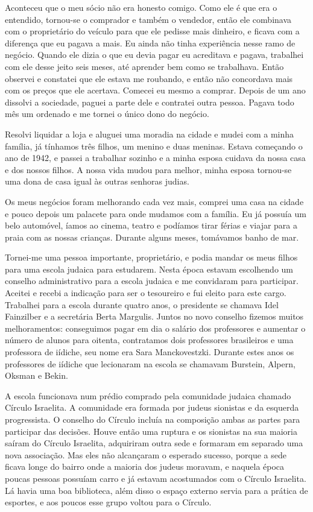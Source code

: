 Aconteceu que o meu sócio não era honesto comigo. Como ele é que era o
entendido, tornou-se o comprador e também o vendedor, então ele
combinava com o proprietário do veículo para que ele pedisse mais
dinheiro, e ficava com a diferença que eu pagava a mais. Eu ainda não
tinha experiência nesse ramo de negócio. Quando ele dizia o que eu devia
pagar eu acreditava e pagava, trabalhei com ele desse jeito seis meses,
até aprender bem como se trabalhava. Então observei e constatei que ele
estava me roubando, e então não concordava mais com os preços que ele
acertava. Comecei eu mesmo a comprar. Depois de um ano dissolvi a
sociedade, paguei a parte dele e contratei outra pessoa. Pagava todo mês
um ordenado e me tornei o único dono do negócio.

Resolvi liquidar a loja e aluguei uma moradia na cidade e mudei com a
minha família, já tínhamos três filhos, um menino e duas meninas. Estava
começando o ano de 1942, e passei a trabalhar sozinho e a minha esposa
cuidava da nossa casa e dos nossos filhos. A nossa vida mudou para
melhor, minha esposa tornou-se uma dona de casa igual às outras senhoras
judias.

Os meus negócios foram melhorando cada vez mais, comprei uma casa na
cidade e pouco depois um palacete para onde mudamos com a família. Eu já
possuía um belo automóvel, íamos ao cinema, teatro e podíamos tirar
férias e viajar para a praia com as nossas crianças. Durante alguns
meses, tomávamos banho de mar.

Tornei-me uma pessoa importante, proprietário, e podia mandar os meus
filhos para uma escola judaica para estudarem. Nesta época estavam
escolhendo um conselho administrativo para a escola judaica e me
convidaram para participar. Aceitei e recebi a indicação para ser o
tesoureiro e fui eleito para este cargo. Trabalhei para a escola durante
quatro anos, o presidente se chamava Idel Fainzilber e a secretária
Berta Margulis. Juntos no novo conselho fizemos muitos melhoramentos:
conseguimos pagar em dia o salário dos professores e aumentar o número
de alunos para oitenta, contratamos dois professores brasileiros e uma
professora de iídiche, seu nome era Sara Manckovestzki. Durante estes
anos os professores de iídiche que lecionaram na escola se chamavam
Burstein, Alpern, Oksman e Bekin.

A escola funcionava num prédio comprado pela comunidade judaica chamado
Círculo Israelita. A comunidade era formada por judeus sionistas e da
esquerda progressista. O conselho do Círculo incluía na composição ambas
as partes para participar das decisões. Houve então uma ruptura e os
sionistas na sua maioria saíram do Círculo Israelita, adquiriram outra
sede e formaram em separado uma nova associação. Mas eles não alcançaram
o esperado sucesso, porque a sede ficava longe do bairro onde a maioria
dos judeus moravam, e naquela época poucas pessoas possuíam carro e já
estavam acostumados com o Círculo Israelita. Lá havia uma boa
biblioteca, além disso o espaço externo servia para a prática de
esportes, e aos poucos esse grupo voltou para o Círculo.

